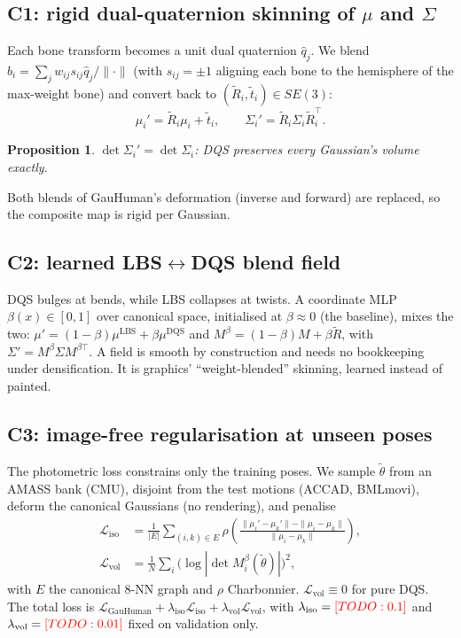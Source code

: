 \documentclass[10pt,twocolumn]{article}
\newtheorem{proposition}{Proposition}
\newcommand{\TODO}[1]{\textcolor{red}{[TODO: #1]}}
\begin{document}
\subsection{C1: rigid dual-quaternion skinning of $\mu$ and $\Sigma$}
Each bone transform becomes a unit dual quaternion $\hat q_j$. We blend $\hat b_i=\sum_j w_{ij}s_{ij}\hat q_j/\|\cdot\|$
(with $s_{ij}=\pm1$ aligning each bone to the hemisphere of the max-weight bone) and convert back to
$(\tilde R_i,\tilde t_i)\in SE(3)$:
\[\mu_i'=\tilde R_i\mu_i+\tilde t_i,\qquad \Sigma_i'=\tilde R_i\Sigma_i\tilde R_i^\top .\]
\begin{proposition}\label{prop:dqs}
$\det\Sigma_i'=\det\Sigma_i$: DQS preserves every Gaussian's volume exactly.
\end{proposition}
Both blends of GauHuman's deformation (inverse and forward) are replaced, so the composite map is rigid per Gaussian.

\subsection{C2: learned LBS$\leftrightarrow$DQS blend field}
DQS bulges at bends, while LBS collapses at twists. A coordinate MLP $\beta(x)\in[0,1]$ over canonical space, initialised
at $\beta\approx0$ (the baseline), mixes the two:
$\mu'=(1-\beta)\mu^\mathrm{LBS}+\beta\mu^\mathrm{DQS}$ and $M^\beta=(1-\beta)M+\beta\tilde R$, with $\Sigma'=M^\beta\Sigma M^{\beta\top}$.
A field is smooth by construction and needs no bookkeeping under densification. It is graphics' ``weight-blended''
skinning, learned instead of painted.

\subsection{C3: image-free regularisation at unseen poses}
The photometric loss constrains only the training poses. We sample $\tilde\theta$ from an AMASS bank (CMU), disjoint
from the test motions (ACCAD, BMLmovi), deform the canonical Gaussians (no rendering), and penalise
\begin{align*}
\mathcal L_\mathrm{iso}&=\tfrac1{|E|}\textstyle\sum_{(i,k)\in E}\rho\!\left(\frac{\|\mu_i'-\mu_k'\|-\|\mu_i-\mu_k\|}{\|\mu_i-\mu_k\|}\right),\\
\mathcal L_\mathrm{vol}&=\tfrac1N\textstyle\sum_i\big(\log|\det M_i^\beta(\tilde\theta)|\big)^2,
\end{align*}
with $E$ the canonical 8-NN graph and $\rho$ Charbonnier. $\mathcal L_\mathrm{vol}\equiv0$ for pure DQS. The total loss is
$\mathcal L_\mathrm{GauHuman}+\lambda_\mathrm{iso}\mathcal L_\mathrm{iso}+\lambda_\mathrm{vol}\mathcal L_\mathrm{vol}$, with
$\lambda_\mathrm{iso}=\TODO{0.1}$ and $\lambda_\mathrm{vol}=\TODO{0.01}$ fixed on validation only.
\end{document}
